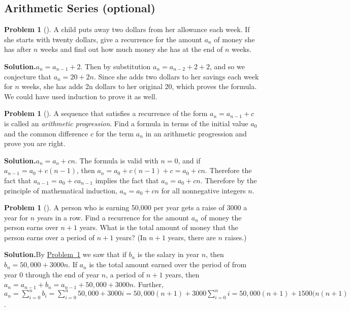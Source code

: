 \documentclass[10pt,]{book}
\theoremstyle{plain}
\theoremstyle{definition}
\newtheorem{activity}[project]{Problem}
\theoremstyle{definition}
\numberwithin{equation}{chapter}
\begin{document}
\subsection[{Arithmetic Series (optional)}]{Arithmetic Series (optional)}\label{subsection-12}
\begin{activity}[]\label{childsaving}
A child puts away two dollars from her allowance each week. If she starts with twenty dollars, give a recurrence for the amount \(a_n\) of money she has after \(n\) weeks and find out how much money she has at the end of \(n\) weeks.%
\par\medskip\noindent%
\textbf{Solution.}\quad \(a_n=a_{n-1} +2\). Then by substitution \(a_n=a_{n-2}+2+2\), and so we conjecture that \(a_n = 20 +2n\). Since she adds two dollars to her savings each week for \(n\) weeks, she has adds 2n dollars to her original 20, which proves the formula. We could have used induction to prove it as well.%
\end{activity}
\begin{activity}[]\label{arithmeticprogression}
A sequence that satisfies a recurrence of the form \(a_n=a_{n-1} +c\) is called an \emph{arithmetic progression}. Find a formula in terms of the initial value \(a_0\) and the common difference \(c\) for the term \(a_n\) in an arithmetic progression and prove you are right.%
\par\medskip\noindent%
\textbf{Solution.}\quad \(a_n =a_o+cn\). The formula is valid with \(n=0\), and if \(a_{n-1}=a_0
+c(n-1)\), then \(a_n = a_0 +c(n-1) +c =a_0+cn\). Therefore the fact that \(a_{n-1}=a_0+ca_{n-1}\) implies the fact that \(a_n=a_0+cn\). Therefore by the principle of mathematical induction, \(a_n=a_0+cn\) for all nonnegative integers \(n\).%
\end{activity}
\begin{activity}[]\label{activity-95}
A person who is earning \textdollar{}50,000 per year gets a raise of \textdollar{}3000 a year for \(n\) years in a row. Find a recurrence for the amount \(a_n\) of money the person earns over \(n+1\) years. What is the total amount of money that the person earns over a period of \(n+1\) years? (In \(n+1\) years, there are \(n\) raises.)%
\par\medskip\noindent%
\textbf{Solution.}\quad By \hyperref[arithmeticprogression]{Problem~\ref{arithmeticprogression}} we saw that if \(b_n\) is the salary in year \(n\), then \(b_n=50,000 + 3000n\). If \(a_n\) is the total amount earned over the period of from year 0 through the end of year \(n\), a period of \(n+1\) years, then \(a_n=a_{n-1}+b_n=a_{n-1}+ 50,000+3000n\). Further, \(a_n=\sum_{i=0}^n b_i=\sum_{i=0}^n50,000 +3000i = 50,000(n+1)+3000\sum_{i=0}^n
i= 50,000(n+1) + 1500(n(n+1)\).%
\end{activity}
\end{document}
